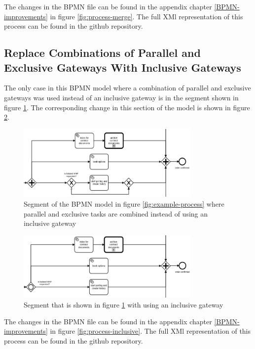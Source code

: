 The changes in the BPMN file can be found in the appendix chapter \ref{BPMN-improvements} in figure \ref{fig:process-merge}. The full XMl representation of this process can be found in the github repository\cite{appendix-registration-4}.

\subsection{Replace Combinations of Parallel and Exclusive Gateways With Inclusive Gateways}
The only case in this BPMN model where a combination of parallel and exclusive gateways was used instead of an inclusive gateway is in the segment shown in figure \ref{fig:exclusive-org}. The corresponding change in this section of the model is shown in figure \ref{fig:exclusive-new}. 


\begin{figure}[H]
	\centering
	\includegraphics[width=0.8\textwidth]{graphics/case-study-exclusive-org}
	\caption{Segment of the BPMN model in figure \ref{fig:example-process} where parallel and exclusive tasks are combined instead of using an inclusive gateway}
	\label{fig:exclusive-org}
\end{figure}
\begin{figure}[H]
	\centering
	\includegraphics[width=0.8\textwidth]{graphics/case-study-exclusive-new}
	\caption{Segment that is shown in figure \ref{fig:exclusive-org} with using an inclusive gateway}
	\label{fig:exclusive-new}
\end{figure}

The changes in the BPMN file can be found in the appendix chapter \ref{BPMN-improvements} in figure \ref{fig:process-inclusive}. The full XMl representation of this process can be found in the github repository\cite{appendix-registration-5}.
